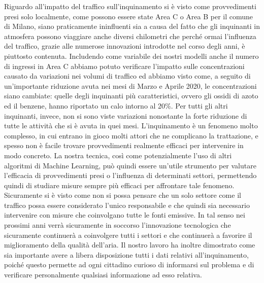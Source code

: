 \documentclass[a4paper]{report}
\begin{document}
Riguardo all'impatto del traffico sull'inquinamento si è visto come provvedimenti presi solo localmente, come possono essere state Area C o Area B per il comune di Milano, siano praticamente ininfluenti sia a causa del fatto che gli inquinanti in atmosfera possono viaggiare anche diversi chilometri che perché ormai l'influenza del traffico, grazie alle numerose innovazioni introdotte nel corso degli anni, è piuttosto contenuta. Includendo come variabile dei nostri modelli anche il numero di ingressi in Area C abbiamo potuto verificare l'impatto sulle concentrazioni causato da variazioni nei volumi di traffico ed abbiamo visto come, a seguito di un'importante riduzione avuta nei mesi di Marzo e Aprile 2020, le concentrazioni siano cambiate: quelle degli inquinanti più caratteristici, ovvero gli ossidi di azoto ed il benzene, hanno riportato un calo intorno al 20\%. Per tutti gli altri inquinanti, invece, non si sono viste variazioni nonostante la forte riduzione di tutte le attività che si è avuta in quei mesi.
L'inquinamento è un fenomeno molto complesso, in cui entrano in gioco molti attori che ne complicano la trattazione, e spesso non è facile trovare provvedimenti realmente efficaci per intervenire in modo concreto. La nostra tecnica, così come potenzialmente l'uso di altri algoritmi di Machine Learning, può quindi essere un'utile strumento per valutare l'efficacia di provvedimenti presi o l'influenza di determinati settori, permettendo quindi di studiare misure sempre più efficaci per affrontare tale fenomeno. Sicuramente si è visto come non si possa pensare che un solo settore come il traffico possa essere considerato l'unico responsabile e che quindi sia necessario intervenire con misure che coinvolgano tutte le fonti emissive. In tal senso nei prossimi anni verrà sicuramente in soccorso l'innovazione tecnologica che sicuramente continuerà a coinvolgere tutti i settori e che continuerà a favorire il miglioramento della qualità dell'aria.  
Il nostro lavoro ha inoltre dimostrato come sia importante avere a libera disposizione tutti i dati relativi all'inquinamento, poiché questo permette ad ogni cittadino curioso di informarsi sul problema e di verificare personalmente qualsiasi informazione ad esso relativa.






\end{document}
